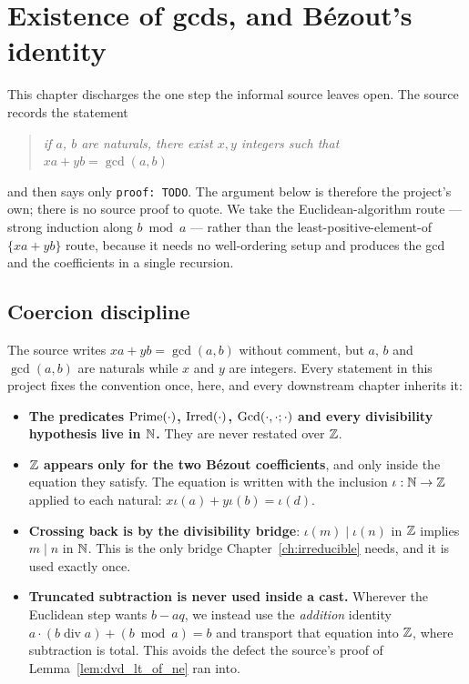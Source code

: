 \chapter{Existence of gcds, and B\'ezout's identity}
\label{ch:bezout}

This chapter discharges the one step the informal source leaves open. The source
records the statement

\begin{quote}
  \emph{if $a$, $b$ are naturals, there exist $x, y$ integers such that
  $x a + y b = \gcd(a,b)$}
\end{quote}

and then says only \texttt{proof: TODO}. The argument below is therefore the
project's own; there is no source proof to quote. We take the Euclidean-algorithm
route --- strong induction along $b \bmod a$ --- rather than the
least-positive-element-of $\{xa + yb\}$ route, because it needs no well-ordering
setup and produces the gcd and the coefficients in a single recursion.

\section{Coercion discipline}

The source writes $x a + y b = \gcd(a,b)$ without comment, but $a$, $b$ and
$\gcd(a,b)$ are naturals while $x$ and $y$ are integers. Every statement in this
project fixes the convention once, here, and every downstream chapter inherits
it:

\begin{itemize}
  \item \textbf{The predicates $\mathrm{Prime}(\cdot)$, $\mathrm{Irred}(\cdot)$, $\mathrm{Gcd}(\cdot,\cdot;\cdot)$ and
    every divisibility hypothesis live in $\mathbb{N}$.} They are never restated over
    $\mathbb{Z}$.
  \item \textbf{$\mathbb{Z}$ appears only for the two B\'ezout coefficients}, and only
    inside the equation they satisfy. The equation is written with the inclusion
    $\iota : \mathbb{N} \to \mathbb{Z}$ applied to each natural: $x\iota(a) + y\iota(b) = \iota(d)$.
  \item \textbf{Crossing back is by the divisibility bridge}: $\iota(m) \mid \iota(n)$
    in $\mathbb{Z}$ implies $m \mid n$ in $\mathbb{N}$. This is the only bridge
    Chapter~\ref{ch:irreducible} needs, and it is used exactly once.
  \item \textbf{Truncated subtraction is never used inside a cast.} Wherever the
    Euclidean step wants $b - a q$, we instead use the \emph{addition} identity
    $a \cdot (b \operatorname{div} a) + (b \bmod a) = b$ and transport that
    equation into $\mathbb{Z}$, where subtraction is total. This avoids the defect the
    source's proof of Lemma~\ref{lem:dvd_lt_of_ne} ran into.
\end{itemize}

